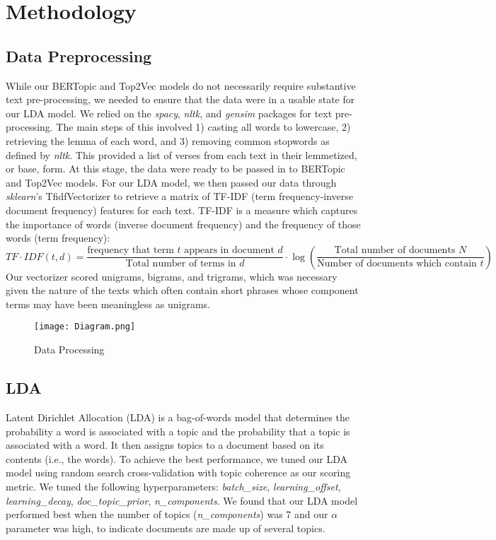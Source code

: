\documentclass{article}
\begin{document}
\section{Methodology}
    \subsection{Data Preprocessing}
    While our BERTopic and Top2Vec models do not necessarily require substantive text pre-processing, we needed to ensure that the data were in a usable state for our LDA model. We relied on the \textit{spacy}, \textit{nltk}, and \textit{gensim} packages for text pre-processing. The main steps of this involved 1) casting all words to lowercase, 2) retrieving the lemma of each word, and 3) removing common stopwords as defined by \textit{nltk}. This provided a list of verses from each text in their lemmetized, or base, form. At this stage, the data were ready to be passed in to BERTopic and Top2Vec models. For our LDA model, we then passed our data through \textit{sklearn}'s TfidfVectorizer to retrieve a matrix of TF-IDF (term frequency-inverse document frequency) features for each text. TF-IDF is a measure which captures the importance of words (inverse document frequency) and the frequency of those words (term frequency):
    \begin{equation*}
        TF \cdot IDF(t, d) = \frac{\text{frequency that term } t \text{ appears in document } d}{\text{Total number of terms in } d} \cdot \log(\frac{\text{Total number of documents } N}{\text{Number of documents which contain } t})
    \end{equation*}
    Our vectorizer scored unigrams, bigrams, and trigrams, which was necessary given the nature of the texts which often contain short phrases whose component terms may have been meaningless as unigrams.
    \begin{figure}[H]
        \centering
        \texttt{[image: Diagram.png]}
        \caption{Data Processing}
    \end{figure}

    \subsection{LDA}
        Latent Dirichlet Allocation (LDA) is a bag-of-words model that determines the probability a word is associated with a topic and the probability that a topic is associated with a word. It then assigns topics to a document based on its contents (i.e., the words). To achieve the best performance, we tuned our LDA model using random search cross-validation with topic coherence as our scoring metric. We tuned the following hyperparameters: \textit{batch\_size}, \textit{learning\_offset}, \textit{learning\_decay}, \textit{doc\_topic\_prior}, \textit{n\_components}. We found that our LDA model performed best when the number of topics (\textit{n\_components}) was 7 and our $\alpha$ parameter was high, to indicate documents are made up of several topics.
        
\end{document}
